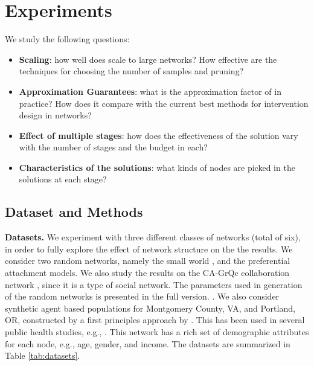 \section{Experiments}
\label{sec:experiments}

We study the following questions:
\begin{itemize}
\item
\textbf{Scaling}: how well does \algo{} scale to large networks? How effective are the techniques for choosing the
number of samples and pruning?
\item
\textbf{Approximation Guarantees}: what is the approximation factor of \algo{} in practice? How does it compare with 
the current best methods for intervention design in networks?
\item
\textbf{Effect of multiple stages}: how does the effectiveness of the solution vary with the number of stages
and the budget in each?
\item
\textbf{Characteristics of the solutions}: what kinds of nodes are picked in the solutions at each stage?
\end{itemize}

\subsection{Dataset and Methods}

\noindent
\textbf{Datasets.}
We experiment with three different classes of networks (total of six),
in order to fully explore the effect of network structure on the the results. 
We consider two random networks, namely the small world 
\cite{Kleinberg00thesmall-world}, and the preferential attachment \cite{Barabasi509} models. We also study the results on the CA-GrQc collaboration network \cite{Leskovec:2007:GED:1217299.1217301}, since it is a type of social network. The parameters used in generation of the random networks is presented in the full version. \cite{fullpaper}. We also consider synthetic agent based populations for Montgomery County, VA, and Portland, OR, constructed by a first principles approach by \cite{barrett:wsc09,eubank:nature04}. This has been used in several public health studies, e.g., \cite{singh:bmc19}. This network has a rich set of demographic attributes for each node, e.g., age, gender, and income.
The datasets are summarized in Table \ref{tab:datasets}.

